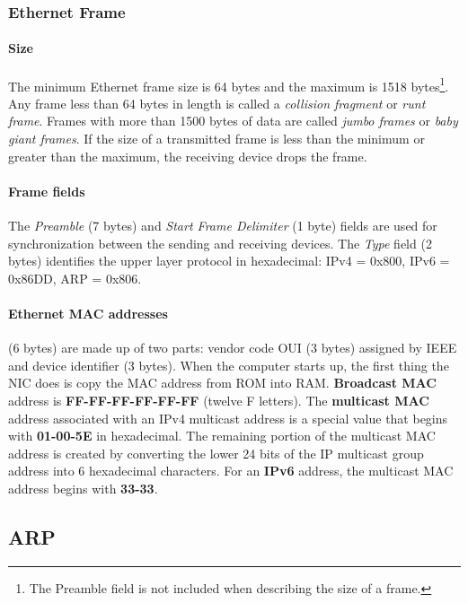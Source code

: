 \subsubsection{Ethernet Frame}

\paragraph{Size} The minimum Ethernet frame size is 64 bytes and the maximum is 1518 bytes\footnote{ The Preamble field is not included when describing the size of a frame.}. Any frame less than 64 bytes in length is called a \emph{collision fragment} or \emph{runt frame}. Frames with more than 1500 bytes of data are called \emph{jumbo frames} or \emph{baby giant frames}. If the size of a transmitted frame is less than the minimum or greater than the maximum, the receiving device drops the frame. 

\paragraph{Frame fields} The \emph{Preamble} (7 bytes) and \emph{Start Frame Delimiter} (1 byte) fields are used for synchronization between the sending and receiving devices. The \emph{Type} field (2 bytes) identifies the upper layer protocol in hexadecimal: IPv4 = 0x800, IPv6 = 0x86DD, ARP = 0x806.

\paragraph{Ethernet MAC addresses}(6 bytes) are made up of two parts: vendor code OUI (3 bytes) assigned by IEEE and device identifier (3 bytes). When the computer starts up, the first thing the NIC does is copy the MAC address from ROM into RAM. \textbf{Broadcast MAC} address is \textbf{FF-FF-FF-FF-FF-FF} (twelve F letters). The \textbf{multicast MAC} address associated with an IPv4 multicast address is a special value that begins with \textbf{01-00-5E} in hexadecimal. The remaining portion of the multicast MAC address is created by converting the lower 24 bits of the IP multicast group address into 6 hexadecimal characters. For an \textbf{IPv6} address, the multicast MAC address begins with \textbf{33-33}.



\subsection{ARP}


